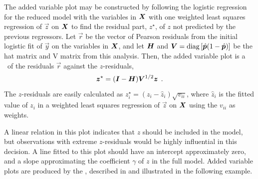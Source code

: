 The added variable plot may be constructed by following the logistic
regression for the reduced model with the variables in $\bm{X}$
with one weighted least squares regression of $\vec{z}$ on
$\bm{X}$ to find the residual part, $z^{\star}$,  of $z$ not predicted
by the previous regressors.
Let $\vec{r}$ be the vector of Pearson residuals from the initial logistic
fit of $\vec{y}$ on the variables in $\bm{X}$,
and let $\bm{H}$ and $\bm{V} = \mathrm{diag}\, [ \hat{\bm{p}} ( 1 - \hat{\bm{p}})]$
be the hat matrix and V matrix from this analysis.
Then, the added variable plot is a \scat\ of
the residuals $\vec{r}$ against the $z$-residuals,
\begin{equation*}%
 \vec{z}^{\star} = ( \mat{I} - \mat{H} ) \mat{V}^{1/2} \vec{z} \period
\end{equation*}
The $z$-residuals are easily calculated as
$z_i^{\star} = ( z_i - \hat{z}_i ) \sqrt{v_{ii}}$,
where $\hat{z}_i$ is the fitted value of $z_i$
in a weighted least squares regression of $\vec{z}$ on $\bm{X}$
using the $v_{ii}$ as weights.

A linear relation in this plot indicates that $z$ should be included in the
model, but observations with extreme $z$-residuals would be highly
influential in this decision.  A line fitted to this plot should have
an intercept approximately zero, and a slope approximating the coefficient
$\gamma$ of $z$ in the full model.
Added variable plots are produced by the , described
in  and illustrated in the following example.

